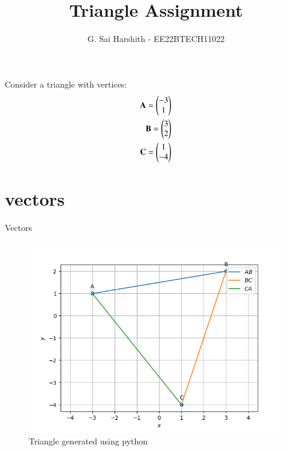 \documentclass[journal,12pt,onecolumn]{IEEEtran}
\theoremstyle{remark}
\begin{document}


\vspace{3cm}
\title{
Triangle Assignment
}
\author{G. Sai Harshith - EE22BTECH11022	
}

\maketitle
\bigskip
\renewcommand{\thefigure}{\theenumi}
\renewcommand{\thetable}{\theenumi}
Consider a triangle with vertices:
\begin{align}
\mathbf{A} = \begin{pmatrix}-3\\1\end{pmatrix}\\
\mathbf{B} = \begin{pmatrix}3\\2\end{pmatrix}\\
\mathbf{C} = \begin{pmatrix}1\\-4\end{pmatrix}
\end{align}
\begin{table}[!ht]
	\section{vectors}
	\centering
	
	\caption{Vectors}
	\label{table:vectors}
\end{table}
\begin{figure}
\includegraphics[width=\columnwidth]{./figs/Q1.1.3.png}
\caption{Triangle generated using python}
\label{fig:vectors}
\end{figure}
\end{document}
